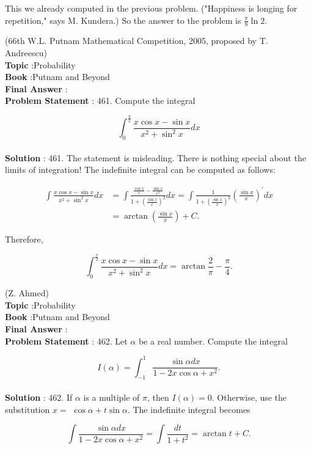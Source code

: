 \documentclass[10pt]{article}
\begin{document}
This we already computed in the previous problem. ("Happiness is longing for repetition," says M. Kundera.) So the answer to the problem is $\frac{\pi}{8} \ln 2$.

(66th W.L. Putnam Mathematical Competition, 2005, proposed by T. Andreescu)
\\
\textbf{Topic} :Probability\\
\textbf{Book} :Putnam and Beyond\\
\textbf{Final Answer} :\\


\textbf{Problem Statement} :
461. Compute the integral

$$
\int_{0}^{\frac{\pi}{2}} \frac{x \cos x-\sin x}{x^{2}+\sin ^{2} x} d x
$$
\\
\textbf{Solution} :
461. The statement is misleading. There is nothing special about the limits of integration! The indefinite integral can be computed as follows:

$$
\begin{aligned}
\int \frac{x \cos x-\sin x}{x^{2}+\sin ^{2} x} d x &=\int \frac{\frac{\cos x}{x}-\frac{\sin x}{x^{2}}}{1+\left(\frac{\sin x}{x}\right)^{2}} d x=\int \frac{1}{1+\left(\frac{\sin x}{x}\right)^{2}}\left(\frac{\sin x}{x}\right)^{\prime} d x \\
&=\arctan \left(\frac{\sin x}{x}\right)+C .
\end{aligned}
$$

Therefore,

$$
\int_{0}^{\frac{\pi}{2}} \frac{x \cos x-\sin x}{x^{2}+\sin ^{2} x} d x=\arctan \frac{2}{\pi}-\frac{\pi}{4} .
$$

(Z. Ahmed)
\\
\textbf{Topic} :Probability\\
\textbf{Book} :Putnam and Beyond\\
\textbf{Final Answer} :\\


\textbf{Problem Statement} :
462. Let $\alpha$ be a real number. Compute the integral

$$
I(\alpha)=\int_{-1}^{1} \frac{\sin \alpha d x}{1-2 x \cos \alpha+x^{2}} .
$$
\\
\textbf{Solution} :
462. If $\alpha$ is a multiple of $\pi$, then $I(\alpha)=0$. Otherwise, use the substitution $x=$ $\cos \alpha+t \sin \alpha$. The indefinite integral becomes

$$
\int \frac{\sin \alpha d x}{1-2 x \cos \alpha+x^{2}}=\int \frac{d t}{1+t^{2}}=\arctan t+C .
$$
\end{document}
